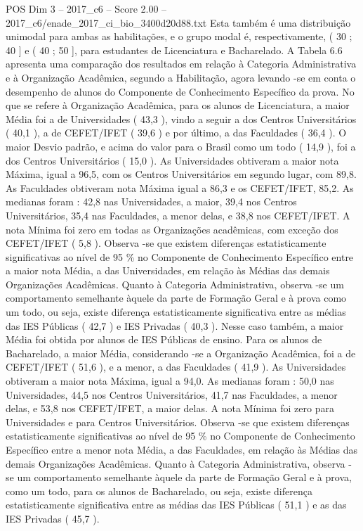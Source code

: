 \begin{textsample}{POS Dim 3 – 2017\_c6 – Score 2.00 – 2017\_c6/enade\_2017\_ci\_bio\_3400d20d88.txt}
Esta também é uma distribuição unimodal para ambas as habilitações, e o grupo modal é, respectivamente, ( 30 ; 40 ] e ( 40 ; 50 ], para estudantes de Licenciatura e Bacharelado.
A Tabela 6.6 apresenta uma comparação dos resultados em relação à Categoria Administrativa e à Organização Acadêmica, segundo a Habilitação, agora levando -se em conta o desempenho de alunos do Componente de Conhecimento Específico da prova.
No que se refere à Organização Acadêmica, para os alunos de Licenciatura, a maior Média foi a de Universidades ( 43,3 ), vindo a seguir a dos Centros Universitários ( 40,1 ), a de CEFET/IFET ( 39,6 ) e por último, a das Faculdades ( 36,4 ).
O maior Desvio padrão, e acima do valor para o Brasil como um todo ( 14,9 ), foi a dos Centros Universitários ( 15,0 ).
As Universidades obtiveram a maior nota Máxima, igual a 96,5, com os Centros Universitários em segundo lugar, com 89,8.
As Faculdades obtiveram nota Máxima igual a 86,3 e os CEFET/IFET, 85,2.
As medianas foram : 42,8 nas Universidades, a maior, 39,4 nos Centros Universitários, 35,4 nas Faculdades, a menor delas, e 38,8 nos CEFET/IFET.
A nota Mínima foi zero em todas as Organizações acadêmicas, com exceção dos CEFET/IFET ( 5,8 ).
Observa -se que existem diferenças estatisticamente significativas ao nível de 95 \% no Componente de Conhecimento Específico entre a maior nota Média, a das Universidades, em relação às Médias das demais Organizações Acadêmicas.
Quanto à Categoria Administrativa, observa -se um comportamento semelhante àquele da parte de Formação Geral e à prova como um todo, ou seja, existe diferença estatisticamente significativa entre as médias das IES Públicas ( 42,7 ) e IES Privadas ( 40,3 ).
Nesse caso também, a maior Média foi obtida por alunos de IES Públicas de ensino.
Para os alunos de Bacharelado, a maior Média, considerando -se a Organização Acadêmica, foi a de CEFET/IFET ( 51,6 ), e a menor, a das Faculdades ( 41,9 ).
As Universidades obtiveram a maior nota Máxima, igual a 94,0.
As medianas foram : 50,0 nas Universidades, 44,5 nos Centros Universitários, 41,7 nas Faculdades, a menor delas, e 53,8 nos CEFET/IFET, a maior delas.
A nota Mínima foi zero para Universidades e para Centros Universitários.
Observa -se que existem diferenças estatisticamente significativas ao nível de 95 \% no Componente de Conhecimento Específico entre a menor nota Média, a das Faculdades, em relação às Médias das demais Organizações Acadêmicas.
Quanto à Categoria Administrativa, observa -se um comportamento semelhante àquele da parte de Formação Geral e à prova, como um todo, para os alunos de Bacharelado, ou seja, existe diferença estatisticamente significativa entre as médias das IES Públicas ( 51,1 ) e as das IES Privadas ( 45,7 ).

\end{textsample}
